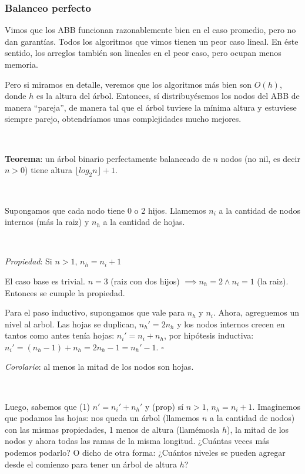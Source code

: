 \subsubsection{Balanceo perfecto}

Vimos que los ABB funcionan razonablemente bien en el caso promedio, pero no dan garant\'ias. Todos los algoritmos que vimos tienen un peor caso lineal. En \'este sentido, los arreglos tambi\'en son lineales en el peor caso, pero ocupan menos memoria.

Pero si miramos en detalle, veremos que los algoritmos m\'as bien son $O(h)$, donde $h$ es la altura del \'arbol. Entonces, s\'i distribuy\'esemos los nodos del ABB de manera ``pareja'', de manera tal que el \'arbol tuviese la m\'inima altura y estuviese siempre parejo, obtendr\'iamos unas complejidades mucho mejores.

~

\textbf{Teorema}: un \'arbol binario perfectamente balanceado de $n$ nodos (no nil, es decir $n>0$) tiene altura $\lfloor log_2 n \rfloor + 1$.

~

Supongamos que cada nodo tiene 0 o 2 hijos. Llamemos $n_i$ a la cantidad de nodos internos (m\'as la raiz) y $n_h$ a la cantidad de hojas.

~

\textit{Propiedad}: Si $n > 1$, $n_h = n_i + 1$

El caso base es trivial. $n = 3$ (raiz con dos hijos) $\implies n_h = 2 \land n_i = 1$ (la raiz). Entonces se cumple la propiedad.

Para el paso inductivo, supongamos que vale para $n_h$ y $n_i$. Ahora, agreguemos un nivel al arbol. Las hojas se duplican, $n_h' = 2n_h$ y los nodos internos crecen en tantos como antes ten\'ia hojas:
$n_i' = n_i + n_h$, por hip\'otesis inductiva: $n_i' = (n_h - 1) + n_h = 2n_h - 1 = n_h' - 1$. $\square$

\textit{Corolario}: al menos la mitad de los nodos son hojas.

~

Luego, sabemos que (1) $n' = n_i' + n_h'$ y (prop) s\'i $n > 1$, $n_h = n_i + 1$. Imaginemos que podamos las hojas: nos queda un \'arbol (llamemos $n$ a la cantidad de nodos) con las mismas propiedades, 1 menos de altura (llam\'emosla $h$), la mitad de los nodos y ahora todas las ramas de la misma longitud. ¿Cu\'antas veces m\'as podemos podarlo? O dicho de otra forma: ¿Cu\'antos niveles se pueden agregar desde el comienzo para tener un \'arbol de altura $h$?

